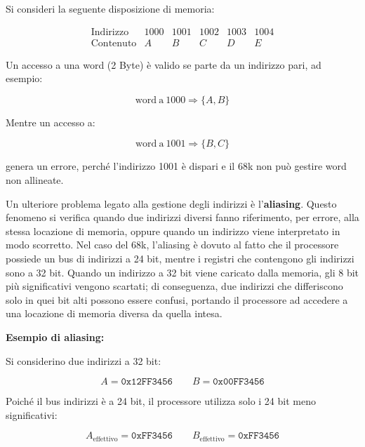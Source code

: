 Si consideri la seguente disposizione di memoria:



\[
\begin{array}{c|c|c|c|c|c}
\mathrm{Indirizzo} & 1000 & 1001 & 1002 & 1003 & 1004 \\
\hline
\mathrm{Contenuto} & A & B & C & D & E
\end{array}
\]



Un accesso a una word (2 Byte) è valido se parte da un indirizzo pari, ad esempio:


\[
\mathrm{word\ a\ } 1000 \Rightarrow \{A, B\}
\]



Mentre un accesso a:


\[
\mathrm{word\ a\ } 1001 \Rightarrow \{B, C\}
\]


genera un errore, perché l'indirizzo 1001 è dispari e il 68k non può gestire word non allineate.

\vspace{1em}

Un ulteriore problema legato alla gestione degli indirizzi è l'\textbf{aliasing}. Questo fenomeno si 
verifica quando due indirizzi diversi fanno riferimento, per errore, alla stessa locazione di memoria, 
oppure quando un indirizzo viene interpretato in modo scorretto. Nel caso del 68k, l'aliasing è dovuto 
al fatto che il processore possiede un bus di indirizzi a 24 bit, mentre i registri che contengono gli 
indirizzi sono a 32 bit. Quando un indirizzo a 32 bit viene caricato dalla memoria, gli 8 bit più 
significativi vengono scartati; di conseguenza, due indirizzi che differiscono solo in quei bit alti 
possono essere confusi, portando il processore ad accedere a una locazione di memoria diversa da quella 
intesa.

\vspace{1em}
\textbf{Esempio di aliasing:}

Si considerino due indirizzi a 32 bit:



\[
A = \texttt{0x12FF3456}
\qquad
B = \texttt{0x00FF3456}
\]



Poiché il bus indirizzi è a 24 bit, il processore utilizza solo i 24 bit meno significativi:



\[
A_{\mathrm{effettivo}} = \texttt{0xFF3456}
\qquad
B_{\mathrm{effettivo}} = \texttt{0xFF3456}
\]



